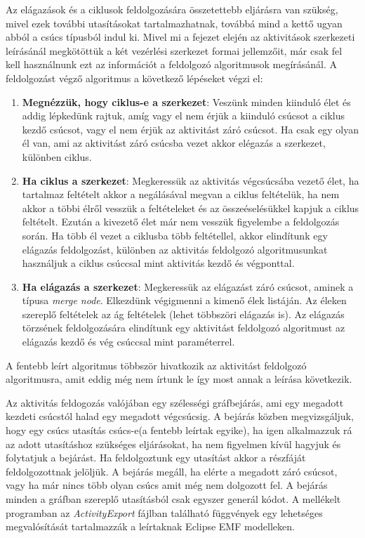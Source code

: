\documentclass[a4paper,12pt]{report}
\begin{document}
Az elágazások és a ciklusok feldolgozására összetettebb eljárásra van szükség, mivel ezek további utasításokat tartalmazhatnak, továbbá mind a kettő ugyan abból a csúcs típusból indul ki. Mivel mi a fejezet elején az aktivitások szerkezeti leírásánál megkötöttük a két vezérlési szerkezet formai jellemzőit, már csak fel kell használnunk ezt az információt a feldolgozó algoritmusok megírásánál. A feldolgozást végző algoritmus a következő lépéseket végzi el:
\begin{enumerate}
\item {\bf Megnézzük, hogy ciklus-e a szerkezet}: Veszünk minden kiinduló élet és addig lépkedünk rajtuk, amíg vagy el nem érjük a kiinduló csúcsot a ciklus kezdő csúcsot, vagy el nem érjük az aktivitást záró csúcsot. Ha csak egy olyan él van, ami az aktivitást záró csúcsba vezet akkor elégazás a szerkezet, különben ciklus.
\item {\bf Ha ciklus a szerkezet}: Megkeressük az aktivitás végcsúcsába vezető élet, ha tartalmaz feltételt akkor a negálásával megvan a ciklus feltételük, ha nem akkor a többi élről vesszük a feltételeket és az összeéselésükkel kapjuk a ciklus feltételt. Ezután a kivezető élet már nem vesszük figyelembe a feldolgozás során. Ha több él vezet a ciklusba több feltétellel, akkor elindítunk egy elágazás feldolgozást, különben az aktivitás feldolgozó algoritmusunkat használjuk a ciklus csúccsal mint aktivitás kezdő és végponttal.
\item {\bf Ha elágazás a szerkezet}: Megkeressük az elágazást záró csúcsot, aminek a típusa {\it merge node}. Elkezdünk végigmenni a kimenő élek listáján. Az éleken szereplő feltételek az ág feltételek (lehet többszöri elágazás is). Az elágazás törzsének feldolgozására elindítunk egy aktivitást feldolgozó algoritmust az elágazás kezdő és vég csúccsal mint paraméterrel.
\end{enumerate}
A fentebb leírt algoritmus többször hivatkozik az aktivitást feldolgozó algoritmusra, amit eddig még nem írtunk le így most annak a leírása következik. 

Az aktivitás feldogozás valójában egy szélességi gráfbejárás, ami egy megadott kezdeti csúcstól halad egy megadott végcsúcsig.
A bejárás közben megvizsgáljuk, hogy egy csúcs utasítás csúcs-e(a fentebb leírtak egyike), ha igen alkalmazzuk rá az adott utasításhoz szükséges eljárásokat, ha nem figyelmen kívül hagyjuk és folytatjuk a bejárást. Ha feldolgoztunk egy utasítást akkor a részfáját feldolgozottnak jelöljük. A bejárás megáll, ha elérte a megadott záró csúcsot, vagy ha már nincs több olyan csúcs amit még nem dolgozott fel. A bejárás minden a gráfban szereplő utasításból csak egyszer generál kódot.
A mellékelt programban az {\it ActivityExport} fájlban található függvények egy lehetséges megvalósítását tartalmazzák a leírtaknak Eclipse EMF\cite{euml} modelleken.
\end{document}
